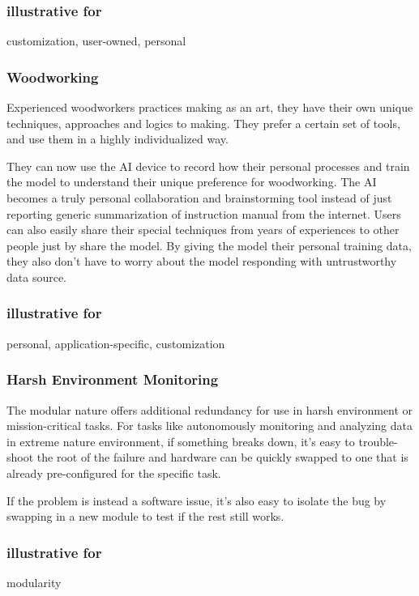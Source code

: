 \documentclass[12pt]{article}
\begin{document}
\subsubsection*{illustrative for}
customization, user-owned, personal

\subsubsection*{Woodworking}
Experienced woodworkers practices making as an art, they have their own unique techniques, approaches and logics to making. They prefer a certain set of tools, and use them in a highly individualized way.

They can now use the AI device to record how their personal processes and train the model to understand their unique preference for woodworking. The AI becomes a truly personal collaboration and brainstorming tool instead of just reporting generic summarization of instruction manual from the internet. Users can also easily share their special techniques from years of experiences to other people just by share the model. By giving the model their personal training data, they also don't have to worry about the model responding with untrustworthy data source.

\subsubsection*{illustrative for}
personal, application-specific, customization

\subsubsection*{Harsh Environment Monitoring}
The modular nature offers additional redundancy for use in harsh environment or mission-critical tasks. For tasks like autonomously monitoring and analyzing data in extreme nature environment, if something breaks down, it's easy to trouble-shoot the root of the failure and hardware can be quickly swapped to one that is already pre-configured for the specific task.

If the problem is instead a software issue, it's also easy to isolate the bug by swapping in a new module to test if the rest still works.

\subsubsection*{illustrative for}
modularity
\end{document}
